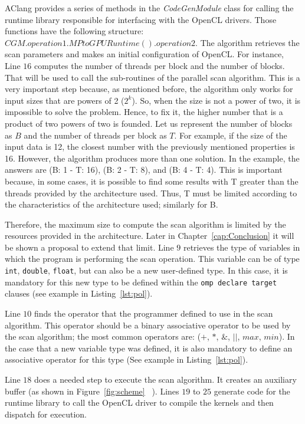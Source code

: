\documentclass[Ingles]{ic-tese-v1}
\newcommand{\rcap}[1]{Chapter~\ref{cap:#1}}
\newcommand{\rfig}[1]{Figure~\ref{fig:#1}}
\newcommand{\ttt}[1]{{\texttt{#1}}}
\newcommand{\rlst}[1]{Listing~\ref{lst:#1}}
\begin{document}
AClang provides a series of methods in the {\it CodeGenModule} class for
calling the runtime library responsible for interfacing with the OpenCL
drivers. Those functions have the following structure:
$CGM.operation1.MPtoGPURuntime().operation2$. The algorithm retrieves the scan
parameters and makes an initial configuration of OpenCL. For instance, Line $16$ computes
the number of threads per block and the number of blocks. That will be used to
call the sub-routines of the parallel scan algorithm. This is a very important
step because, as mentioned before, the algorithm only works for input sizes that
are powers of 2 ($2^{k}$). So, when the size is not a power of two, it is
impossible to solve the problem. Hence, to fix it, the
higher number that is a product of two powers of two is founded. Let us represent the
number of blocks as $B$ and the number of threads per block as $T$.
For example, if the size of the input data is 12, the closest number with
the previously mentioned properties is 16. However, the algorithm produces more
than one solution. In the example, the answers are (B: 1 - T: 16), (B: 2 - T:
8), and (B: 4 - T: 4). This is important because, in some cases, it is possible
to find some results with T greater than the threads provided by the
architecture used. Thus, T must be limited according to the characteristics of
the architecture used; similarly for B.

Therefore, the maximum size to compute the scan algorithm is limited by the
resources provided in the architecture. Later in \rcap{Conclusion} it will be shown
a proposal to extend that limit.  Line $9$ retrieves the type of variables in
which the program is performing the scan operation. This variable can be of
type  \ttt{int},  \ttt{double},  \ttt{float}, but can also be a new user-defined type. In this case,
it is mandatory for this new type to be defined within the \ttt{omp declare target}
clauses (see example in \rlst{pol}).

Line $10$ finds the operator that the programmer defined to use in the scan
algorithm. This operator should be a binary associative operator to be used
by the scan algorithm; the most common operators are: ($+$, $*$, $\&$, $||$,
$max$, $min$). In the case that a new variable type was defined, it is also mandatory
to define an associative operator for this type (See example in \rlst{pol}).

Line $18$ does a needed step to execute the scan algorithm. It creates an
auxiliary buffer (as shown in \rfig{scheme} ~).  Lines $19$ to $25$
generate code for the runtime library to call the OpenCL driver to compile the
kernels and then dispatch  for execution.
\end{document}
